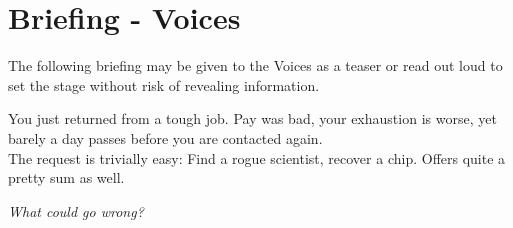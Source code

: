 \chapter{Briefing - Voices}
\begin{exampleblock}
	The following briefing may be given to the Voices as a teaser
		or read out loud to set the stage
		without risk of revealing information.
\end{exampleblock}
You just returned from a tough job.
Pay was bad, your exhaustion is worse,
yet barely a day passes before you are contacted again.
\\%
The request is trivially easy:
Find a rogue scientist, recover a chip.
Offers quite a pretty sum as well.
\par%
\emph{What could go wrong?}
